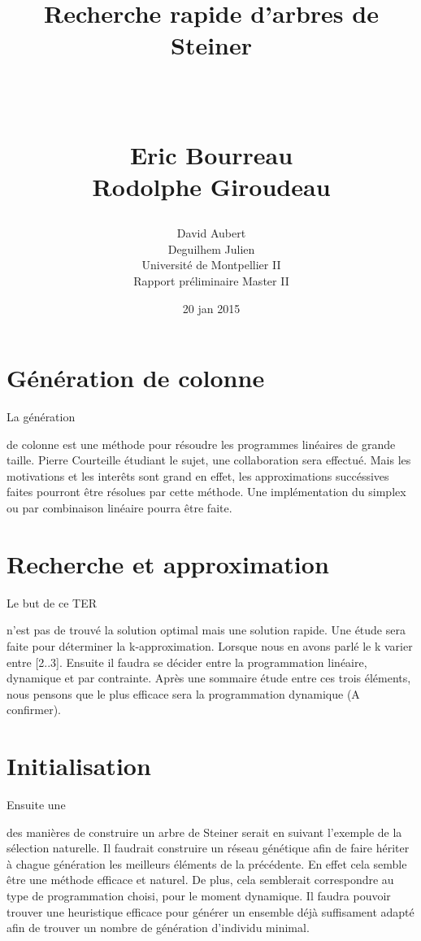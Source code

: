 \documentclass[paper=a4, fontsize=11pt]{scrartcl}	%
\title{ \vspace{-1in} 	\usefont{OT1}{bch}{b}{n}
		\huge \strut Recherche rapide d'arbres de Steiner \strut \\
		\Large \bfseries \strut Eric Bourreau \\ Rodolphe Giroudeau \strut
}
\author{ 									
	\usefont{OT1}{bch}{m}{n} David Aubert\\		
	\usefont{OT1}{bch}{m}{n} Deguilhem Julien\\		
	\usefont{OT1}{bch}{m}{n}Université de  Montpellier II\\	
	\usefont{OT1}{bch}{m}{n}Rapport préliminaire Master II\\
}
\date{20 jan 2015}
\numberwithin{equation}{section}															%
\numberwithin{figure}{section}																%
\numberwithin{table}{section}																%
\begin{document}
\maketitle

\section{Génération de colonne}
\begin{hspace}{1cm}
La génération
\end{hspace}
de colonne est une méthode pour résoudre les programmes linéaires de grande taille. Pierre Courteille étudiant le sujet, une collaboration sera effectué. Mais les motivations et les interêts sont grand en effet, les approximations succéssives faites pourront être résolues par cette méthode. Une implémentation du simplex ou par combinaison linéaire pourra être faite.


\section{Recherche et approximation}
\begin{hspace}{1cm}
	Le but de ce TER
\end{hspace}
n'est pas de trouvé la solution optimal mais une solution rapide. Une étude sera faite pour déterminer la k-approximation. Lorsque  nous en avons parlé le k varier entre [2..3].
\newline
Ensuite il faudra se décider entre la programmation linéaire, dynamique et par contrainte. Après une sommaire étude entre ces trois éléments, nous pensons que le plus efficace sera la programmation dynamique (A confirmer).



\section{Initialisation}
\begin{hspace}{1cm}
	Ensuite une 
\end{hspace}
des manières de construire un arbre de Steiner serait en suivant l'exemple de la sélection naturelle. Il faudrait construire un réseau génétique afin de faire hériter à chague génération les meilleurs éléments de la précédente. En effet cela semble être une méthode efficace et naturel. De plus, cela semblerait correspondre au type de programmation choisi, pour le moment dynamique.
\newline
Il faudra pouvoir trouver une heuristique efficace pour générer un ensemble déjà suffisament adapté afin de trouver un nombre de génération d'individu minimal.
\end{document}
